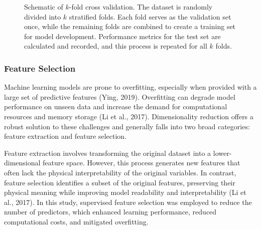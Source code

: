 \documentclass[
]{agujournal2019}
\begin{document}
\begin{figure}


\caption{\label{fig-k-fold}Schematic of \(k\)-fold cross validation. The
dataset is randomly divided into \(k\) stratified folds. Each fold
serves as the validation set once, while the remaining folds are
combined to create a training set for model development. Performance
metrics for the test set are calculated and recorded, and this process
is repeated for all \(k\) folds.}

\end{figure}%

\subsubsection{Feature Selection}\label{feature-selection}

Machine learning models are prone to overfitting, especially when
provided with a large set of predictive features (Ying, 2019).
Overfitting can degrade model performance on unseen data and increase
the demand for computational resources and memory storage (Li et al.,
2017). Dimensionality reduction offers a robust solution to these
challenges and generally falls into two broad categories: feature
extraction and feature selection.

Feature extraction involves transforming the original dataset into a
lower-dimensional feature space. However, this process generates new
features that often lack the physical interpretability of the original
variables. In contrast, feature selection identifies a subset of the
original features, preserving their physical meaning while improving
model readability and interpretability (Li et al., 2017). In this study,
supervised feature selection was employed to reduce the number of
predictors, which enhanced learning performance, reduced computational
costs, and mitigated overfitting.
\end{document}
